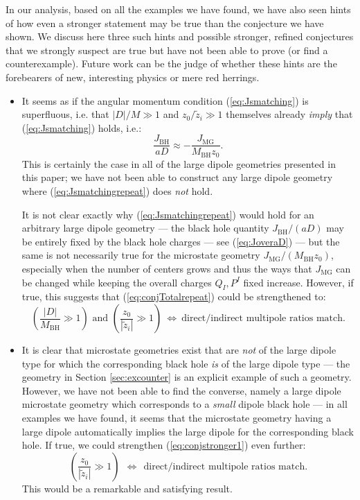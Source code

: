 \documentclass[12pt,a4paper]{article}
\newcommand{\be}{\begin{equation}}
\newcommand{\ee}{\end{equation}}
\begin{document}
In our analysis, based on all the examples we have found, we have also seen hints of how even a stronger statement may be true than the conjecture we have shown. We discuss here three such hints and possible stronger, refined conjectures that we strongly suspect are true but have not been able to prove (or find a counterexample). Future work can be the judge of whether these hints are the forebearers of new, interesting physics or mere red herrings.
\begin{itemize}
\item It seems as if the angular momentum condition (\ref{eq:Jsmatching}) is superfluous, i.e. that $|D|/M\gg 1$ and $z_0/\tilde z_i\gg 1$ themselves already \emph{imply} that (\ref{eq:Jsmatching}) holds, i.e.:
\be \label{eq:Jsmatchingrepeat} \frac{J_\text{BH}}{aD} \approx -\frac{J_{\text{MG}}}{M_\text{BH}z_0}.\ee
This is certainly the case in all of the large dipole geometries presented in this paper; we have not been able to construct any large dipole geometry where (\ref{eq:Jsmatchingrepeat}) does \emph{not} hold.

It is not clear exactly why (\ref{eq:Jsmatchingrepeat}) would hold for an arbitrary large dipole geometry --- the black hole quantity $J_\text{BH}/(aD)$ may be entirely fixed by the black hole charges --- see (\ref{eq:JoveraD}) --- but the same is not necessarily true for the microstate geometry $J_{\text{MG}}/(M_\text{BH}z_0)$, especially when the number of centers grows and thus the ways that $J_{\text{MG}}$ can be changed while keeping the overall charges $Q_I,P^I$ fixed increase. However, if true, this suggests that (\ref{eq:conjTotalrepeat}) could be strengthened to:
  \be \label{eq:conjstronger1} \left(\frac{|D|}{M_\text{BH}}\gg 1\right)  \text{ and } \left(\frac{z_0}{|\tilde z_i|}\gg 1\right)
  \ \Leftrightarrow\  \text{direct/indirect multipole ratios match}.
 \ee

\item It is clear that microstate geometries exist that are \emph{not} of the large dipole type for which the corresponding black hole \emph{is} of the large dipole type --- the geometry in Section \ref{sec:excounter} is an explicit example of such a geometry. However, we have not been able to find the converse, namely a large dipole microstate geometry which corresponds to a \emph{small} dipole black hole --- in all examples we have found, it seems that the microstate geometry having a large dipole automatically implies the large dipole for the corresponding black hole. If true, we could strengthen (\ref{eq:conjstronger1}) even further:
  \be  \label{eq:conjstronger2}\left(\frac{z_0}{|\tilde z_i|}\gg 1\right)
 \ \ \Leftrightarrow\ \ \text{direct/indirect multipole ratios match}.
 \ee
 This would be a remarkable and satisfying result. 


\end{itemize}
\end{document}

